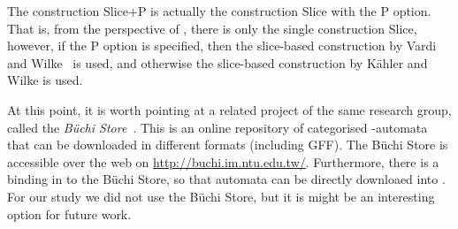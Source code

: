 The construction Slice+P is actually the construction Slice with the P option. That is, from the perspective of \goal, there is only the single construction Slice, however, if the P option is specified, then the slice-based construction by Vardi and Wilke~\cite{vardi2007automata} is used, and otherwise the slice-based construction by Kähler and Wilke \cite{2008_kaehler} is used.





At this point, it is worth pointing at a related project of the same research group, called the \textit{Büchi Store}~\cite{2011_buchi_store}. This is an online repository of categorised \om-automata that can be downloaded in different formats (including GFF). The Büchi Store is accessible over the web on \url{http://buchi.im.ntu.edu.tw/}. Furthermore, there is a binding in \goal{} to the Büchi Store, so that automata can be directly downloaed into \goal. For our study we did not use the Büchi Store, but it is might be an interesting option for future work.



